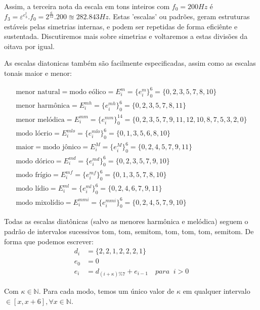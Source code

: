 Assim, a terceira nota da escala em tons inteiros com $f_0=200Hz$
é $f_3=\varepsilon^{e_3^t} . f_0 = 2^{\frac{6}{12}} . 200 \approxeq 282.843 Hz$. Estas
'escalas' ou padrões, geram estruturas estáveis pelas simetrias internas, e podem ser
repetidas de forma eficiênte e sustentada. Discutiremos mais sobre simetrias e voltaremos
a estas divisões da oitava por igual.

As escalas diatonicas também são facilmente especificadas, assim como
as escalas tonais maior e menor:


\begin{equation}
\begin{split}
\text{menor natural} = \text{modo eólico} = E_i^m = \{e_i^m\}_0^6 = \{0,2,3,5,7,8,10\} \\
\text{menor harmônica} = E_i^{mh} = \{e_i^{mh}\}_0^6 = \{0,2,3,5,7,8,11\} \\
\text{menor melódica} = E_i^{mm} = \{e_i^{mm}\}_0^{14} = \{0,2,3,5,7,9,11,12,10,8,7,5,3,2,0\} \\
\text{modo lócrio} = E_i^{mlo} = \{e_i^{mlo}\}_0^6 = \{0,1,3,5,6,8,10\} \\ 
\text{maior} = \text{modo jônico} = E_i^M = \{e_i^M\}_0^6 = \{0,2,4,5,7,9,11\} \\
\text{modo dórico} = E_i^{md} = \{e_i^{md}\}_0^6 = \{0,2,3,5,7,9,10\} \\
\text{modo frígio} = E_i^{mf} = \{e_i^{mf}\}_0^6 = \{0,1,3,5,7,8,10\} \\
\text{modo lídio} = E_i^{ml}=\{e_i^{ml}\}_0^6 = \{0,2,4,6,7,9,11\} \\
\text{modo mixolídio} = E_i^{mmi} = \{e_i^{mmi}\}_0^6 = \{0,2,4,5,7,9,10\}
\end{split}
\end{equation}

Todas as escalas diatônicas (salvo as menores harmônica e melódica)
seguem o padrão de intervalos sucessivos
tom, tom, semitom, tom, tom, tom, semitom. De forma
que podemos escrever:
\begin{equation}
\begin{split}
d_i & =\{2,2,1,2,2,2,1\} \\
e_0 & =0 \\
e_i & =d_{(i+\kappa)\%7}+e_{i-1} \quad para \;\;  i > 0
\end{split}
\end{equation}

Com $\kappa \in \mathbb{N}$. Para cada
modo, temos um único valor de $\kappa$ em qualquer intervalo $\in [x,x+6], \forall x \in \mathbb{N}$.


